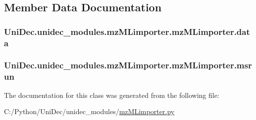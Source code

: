 \subsection{Member Data Documentation}
\hypertarget{class_uni_dec_1_1unidec__modules_1_1mz_m_limporter_1_1mz_m_limporter_a54420688600df621e32b81d9e3aa3a77}{}
\subsubsection[{data}]{\setlength{\rightskip}{0pt plus 5cm}Uni\+Dec.\+unidec\+\_\+modules.\+mz\+M\+Limporter.\+mz\+M\+Limporter.\+data}\label{class_uni_dec_1_1unidec__modules_1_1mz_m_limporter_1_1mz_m_limporter_a54420688600df621e32b81d9e3aa3a77}
\hypertarget{class_uni_dec_1_1unidec__modules_1_1mz_m_limporter_1_1mz_m_limporter_ade9fc5a572dae0b438c7e27000391950}{}
\subsubsection[{msrun}]{\setlength{\rightskip}{0pt plus 5cm}Uni\+Dec.\+unidec\+\_\+modules.\+mz\+M\+Limporter.\+mz\+M\+Limporter.\+msrun}\label{class_uni_dec_1_1unidec__modules_1_1mz_m_limporter_1_1mz_m_limporter_ade9fc5a572dae0b438c7e27000391950}


The documentation for this class was generated from the following file\+:\begin{DoxyCompactItemize}
\item 
C\+:/\+Python/\+Uni\+Dec/unidec\+\_\+modules/\hyperlink{mz_m_limporter_8py}{mz\+M\+Limporter.\+py}\end{DoxyCompactItemize}
